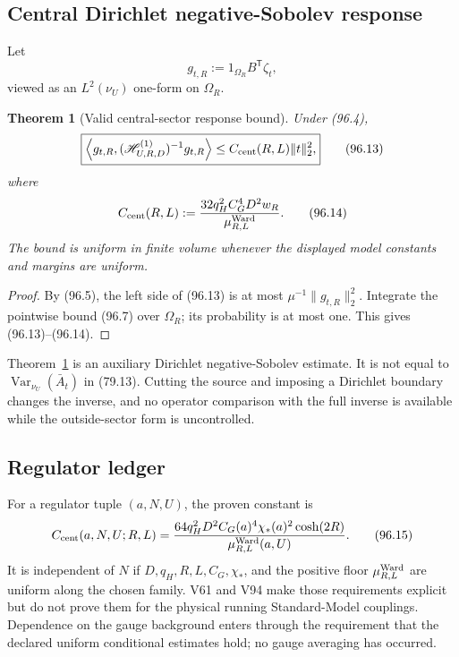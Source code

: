 \documentclass[11pt]{article}
\newtheorem{theorem}{Theorem}[section]
\theoremstyle{remark}
\begin{document}
\subsection{Central Dirichlet negative-Sobolev response}

Let
\[
 g_{t,R}:=1_{\Omega_R}B^{\mathsf T}\zeta_t,          \tag{96.12}
\]
viewed as an \(L^2(\nu_U)\) one-form on \(\Omega_R\).

\begin{theorem}[Valid central-sector response bound]
\label{thm:v17v96-central-response}
Under (96.4),
\[
\boxed{
 \left\langle g_{t,R},
 (\mathscr H_{U,R,D}^{(1)})^{-1}g_{t,R}
 \right\rangle
 \leq C_{\rm cent}(R,L)\|t\|_2^2,}                 \tag{96.13}
\]
where
\[
 C_{\rm cent}(R,L)
 :=\frac{32q_H^2C_G^4D^2w_R}
          {\mu_{R,L}^{\rm Ward}}.                  \tag{96.14}
\]
The bound is uniform in finite volume whenever the displayed model
constants and margins are uniform.
\end{theorem}

\begin{proof}
By (96.5), the left side of (96.13) is at most
\(\mu^{-1}\|g_{t,R}\|_2^2\).  Integrate the pointwise bound (96.7)
over \(\Omega_R\); its probability is at most one.  This gives
(96.13)--(96.14).
\end{proof}

Theorem~\ref{thm:v17v96-central-response} is an auxiliary Dirichlet
negative-Sobolev estimate.  It is not equal to
\(\operatorname{Var}_{\nu_U}(\bar A_t)\) in (79.13).  Cutting the
source and imposing a Dirichlet boundary changes the inverse, and no
operator comparison with the full inverse is available while the
outside-sector form is uncontrolled.

\subsection{Regulator ledger}

For a regulator tuple \((a,N,U)\), the proven constant is
\[
 C_{\rm cent}(a,N,U;R,L)
 =\frac{64q_H^2D^2C_G(a)^4\chi_*(a)^2\cosh(2R)}
        {\mu_{R,L}^{\rm Ward}(a,U)}.                \tag{96.15}
\]
It is independent of \(N\) if \(D,q_H,R,L,C_G,\chi_*\), and the
positive floor \(\mu_{R,L}^{\rm Ward}\) are uniform along the chosen
family.  V61 and V94 make those requirements explicit but do not prove
them for the physical running Standard-Model couplings.  Dependence on
the gauge background enters through the requirement that the declared
uniform conditional estimates hold; no gauge averaging has occurred.
\end{document}
